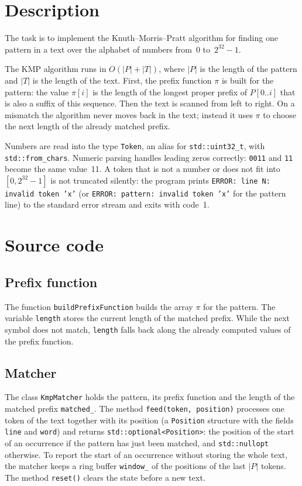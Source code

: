 \section{Description}

The task is to implement the Knuth--Morris--Pratt algorithm for finding one pattern
in a text over the alphabet of numbers from~0 to~$2^{32}-1$.

The KMP algorithm runs in $O(|P| + |T|)$, where $|P|$ is the length of the pattern and $|T|$ is
the length of the text. First, the prefix function $\pi$ is built for the pattern: the value
$\pi[i]$ is the length of the longest proper prefix of $P[0..i]$ that is also a suffix of this
sequence. Then the text is scanned from left to right. On a mismatch the algorithm never moves
back in the text; instead it uses $\pi$ to choose the next length of the already matched prefix.

Numbers are read into the type \texttt{Token}, an alias for \texttt{std::uint32\_t}, with
\texttt{std::from\_chars}. Numeric parsing handles leading zeros correctly: \texttt{0011} and
\texttt{11} become the same value~11. A token that is not a number or does not fit into
$[0, 2^{32}-1]$ is not truncated silently: the program prints
\texttt{ERROR: line N: invalid token 'x'} (or \texttt{ERROR: pattern: invalid token 'x'} for the
pattern line) to the standard error stream and exits with code~1.

\pagebreak

\section{Source code}

\subsection{Prefix function}

The function \texttt{buildPrefixFunction} builds the array $\pi$ for the pattern. The variable
\texttt{length} stores the current length of the matched prefix. While the next symbol does not
match, \texttt{length} falls back along the already computed values of the prefix function.

\subsection{Matcher}

The class \texttt{KmpMatcher} holds the pattern, its prefix function and the length of the
matched prefix \texttt{matched\_}. The method \texttt{feed(token, position)} processes one
token of the text together with its position (a \texttt{Position} structure with the fields
\texttt{line} and \texttt{word}) and returns \texttt{std::optional<Position>}: the position of
the start of an occurrence if the pattern has just been matched, and \texttt{std::nullopt}
otherwise. To report the start of an occurrence without storing the whole text, the matcher
keeps a ring buffer \texttt{window\_} of the positions of the last $|P|$ tokens. The method
\texttt{reset()} clears the state before a new text.

